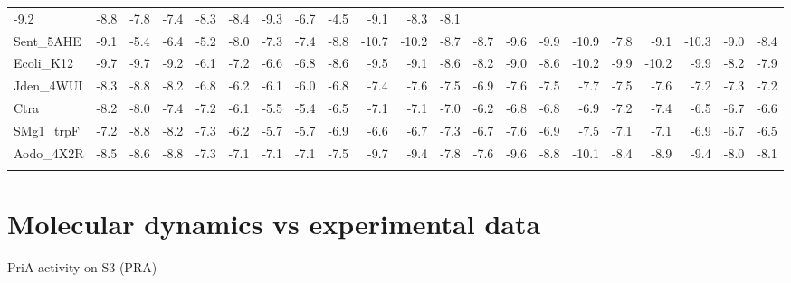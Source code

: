 \documentclass[12pt,twoside]{reedthesis}
\begin{document}
\begin{longtable}[]{@{}lrrrrrrrrrrrrrrrrrrrr@{}}
  -9.2 & -8.8 & -7.8 & -7.4 & -8.3 & -8.4 & -9.3 & -6.7 & -4.5 & -9.1 &
  -8.3 & -8.1\tabularnewline
  Sent\_5AHE & -9.1 & -5.4 & -6.4 & -5.2 & -8.0 & -7.3 & -7.4 & -8.8 &
  -10.7 & -10.2 & -8.7 & -8.7 & -9.6 & -9.9 & -10.9 & -7.8 & -9.1 & -10.3
  & -9.0 & -8.4\tabularnewline
  Ecoli\_K12 & -9.7 & -9.7 & -9.2 & -6.1 & -7.2 & -6.6 & -6.8 & -8.6 &
  -9.5 & -9.1 & -8.6 & -8.2 & -9.0 & -8.6 & -10.2 & -9.9 & -10.2 & -9.9 &
  -8.2 & -7.9\tabularnewline
  Jden\_4WUI & -8.3 & -8.8 & -8.2 & -6.8 & -6.2 & -6.1 & -6.0 & -6.8 &
  -7.4 & -7.6 & -7.5 & -6.9 & -7.6 & -7.5 & -7.7 & -7.5 & -7.6 & -7.2 &
  -7.3 & -7.2\tabularnewline
  Ctra & -8.2 & -8.0 & -7.4 & -7.2 & -6.1 & -5.5 & -5.4 & -6.5 & -7.1 &
  -7.1 & -7.0 & -6.2 & -6.8 & -6.8 & -6.9 & -7.2 & -7.4 & -6.5 & -6.7 &
  -6.6\tabularnewline
  SMg1\_trpF & -7.2 & -8.8 & -8.2 & -7.3 & -6.2 & -5.7 & -5.7 & -6.9 &
  -6.6 & -6.7 & -7.3 & -6.7 & -7.6 & -6.9 & -7.5 & -7.1 & -7.1 & -6.9 &
  -6.7 & -6.5\tabularnewline
  Aodo\_4X2R & -8.5 & -8.6 & -8.8 & -7.3 & -7.1 & -7.1 & -7.1 & -7.5 &
  -9.7 & -9.4 & -7.8 & -7.6 & -9.6 & -8.8 & -10.1 & -8.4 & -8.9 & -9.4 &
  -8.0 & -8.1\tabularnewline
  \clearpage & & & & & & & & & & & & & & & & & & & &\tabularnewline
  \bottomrule
  \end{longtable}
  
  \section{Molecular dynamics vs experimental
  data}\label{molecular-dynamics-vs-experimental-data}
  
  PriA activity on S3 (PRA)
  
\end{document}
